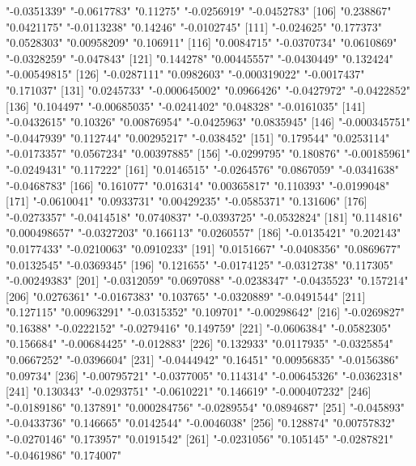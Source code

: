 \begin{Schunk}
\begin{Soutput}
[101] "-0.0351339"   "-0.0617783"   "0.11275"      "-0.0256919"   "-0.0452783"  
[106] "0.238867"     "0.0421175"    "-0.0113238"   "0.14246"      "-0.0102745"  
[111] "-0.024625"    "0.177373"     "0.0528303"    "0.00958209"   "0.106911"    
[116] "0.0084715"    "-0.0370734"   "0.0610869"    "-0.0328259"   "-0.047843"   
[121] "0.144278"     "0.00445557"   "-0.0430449"   "0.132424"     "-0.00549815" 
[126] "-0.0287111"   "0.0982603"    "-0.000319022" "-0.0017437"   "0.171037"    
[131] "0.0245733"    "-0.000645002" "0.0966426"    "-0.0427972"   "-0.0422852"  
[136] "0.104497"     "-0.00685035"  "-0.0241402"   "0.048328"     "-0.0161035"  
[141] "-0.0432615"   "0.10326"      "0.00876954"   "-0.0425963"   "0.0835945"   
[146] "-0.000345751" "-0.0447939"   "0.112744"     "0.00295217"   "-0.038452"   
[151] "0.179544"     "0.0253114"    "-0.0173357"   "0.0567234"    "0.00397885"  
[156] "-0.0299795"   "0.180876"     "-0.00185961"  "-0.0249431"   "0.117222"    
[161] "0.0146515"    "-0.0264576"   "0.0867059"    "-0.0341638"   "-0.0468783"  
[166] "0.161077"     "0.016314"     "0.00365817"   "0.110393"     "-0.0199048"  
[171] "-0.0610041"   "0.0933731"    "0.00429235"   "-0.0585371"   "0.131606"    
[176] "-0.0273357"   "-0.0414518"   "0.0740837"    "-0.0393725"   "-0.0532824"  
[181] "0.114816"     "0.000498657"  "-0.0327203"   "0.166113"     "0.0260557"   
[186] "-0.0135421"   "0.202143"     "0.0177433"    "-0.0210063"   "0.0910233"   
[191] "0.0151667"    "-0.0408356"   "0.0869677"    "0.0132545"    "-0.0369345"  
[196] "0.121655"     "-0.0174125"   "-0.0312738"   "0.117305"     "-0.00249383" 
[201] "-0.0312059"   "0.0697088"    "-0.0238347"   "-0.0435523"   "0.157214"    
[206] "0.0276361"    "-0.0167383"   "0.103765"     "-0.0320889"   "-0.0491544"  
[211] "0.127115"     "0.00963291"   "-0.0315352"   "0.109701"     "-0.00298642" 
[216] "-0.0269827"   "0.16388"      "-0.0222152"   "-0.0279416"   "0.149759"    
[221] "-0.0606384"   "-0.0582305"   "0.156684"     "-0.00684425"  "-0.012883"   
[226] "0.132933"     "0.0117935"    "-0.0325854"   "0.0667252"    "-0.0396604"  
[231] "-0.0444942"   "0.16451"      "0.00956835"   "-0.0156386"   "0.09734"     
[236] "-0.00795721"  "-0.0377005"   "0.114314"     "-0.00645326"  "-0.0362318"  
[241] "0.130343"     "-0.0293751"   "-0.0610221"   "0.146619"     "-0.000407232"
[246] "-0.0189186"   "0.137891"     "0.000284756"  "-0.0289554"   "0.0894687"   
[251] "-0.045893"    "-0.0433736"   "0.146665"     "0.0142544"    "-0.0046038"  
[256] "0.128874"     "0.00757832"   "-0.0270146"   "0.173957"     "0.0191542"   
[261] "-0.0231056"   "0.105145"     "-0.0287821"   "-0.0461986"   "0.174007"    

\end{Soutput}
\end{Schunk}
